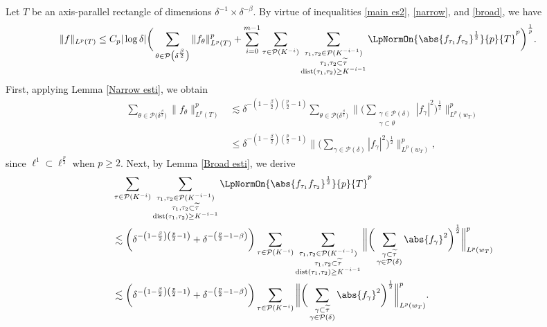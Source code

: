 \documentclass[reqno,centertags,11pt,a4paper]{amsart}
\begin{document}
Let $T$ be an axis-parallel rectangle of dimensions $\delta^{-1} \times \delta^{-\beta}$. By virtue of inequalities \eqref{main es2}, \eqref{narrow}, and \eqref{broad}, we have
\begin{align*}
\|f\|_{L^p(T)}
&\leq C_p|\log\delta| \bigg( \sum_{\theta \in \mathcal{P}\bigl(\delta^{\frac{\beta}{2}}\bigr)} \|f_\theta\|_{L^p(T)}^p + \sum_{i=0}^{m-1} \sum_{\tau \in \mathcal{P}(K^{-i})} \sum_{\substack{\tau_1,\tau_2 \in \mathcal{P}(K^{-i-1}) \\ \tau_1,\tau_2 \subset \widetilde{\tau} \\ \text{dist}(\tau_1,\tau_2) \geq  K^{-i-1}}} \LpNormOn{\abs{f_{\tau_1}f_{\tau_2}}^{\frac{1}{2}}}{p}{T}^p \bigg)^{\frac{1}{p}}.
\end{align*}
First, applying Lemma \ref{Narrow esti}, we obtain
\begin{align*}
\sum_{\theta \in \mathcal{P}\bigl(\delta^{\frac{\beta}{2}}\bigr)} \|f_\theta\|_{L^p(T)}^p
&\lesssim \delta^{-\left(1 - \frac{\beta}{2}\right)\left(\frac{p}{2} - 1\right)} \sum_{\theta \in \mathcal{P}\bigl(\delta^{\frac{\beta}{2}}\bigr)} \bigg\| \bigg( \sum_{\substack{\gamma \in \mathcal{P}(\delta) \\ \gamma \subset \theta}} |f_\gamma|^2 \bigg)^{\frac{1}{2}} \bigg\|_{L^p(w_T)}^p \\
&\leq \delta^{-\left(1 - \frac{\beta}{2}\right)\left(\frac{p}{2} - 1\right)} \bigg\| \bigg( \sum_{\gamma \in \mathcal{P}(\delta)} |f_\gamma|^2 \bigg)^{\frac{1}{2}} \bigg\|_{L^p(w_T)}^p,
\end{align*}
since $\ell^1 \subset \ell^{\frac{p}{2}}$ when $p\geq 2$. Next, by Lemma \ref{Broad esti}, we derive
\begin{align*}
& \sum_{\tau \in \mathcal{P}(K^{-i})} \sum_{\substack{\tau_1,\tau_2 \in \mathcal{P}(K^{-i-1}) \\ \tau_1,\tau_2 \subset \widetilde{\tau} \\ \text{dist}(\tau_1,\tau_2) \geq  K^{-i-1}}} \LpNormOn{\abs{f_{\tau_1}f_{\tau_2}}^{\frac{1}{2}}}{p}{T}^p \\
&\lesssim \bigg( \delta^{-\left(1 - \frac{\beta}{2}\right)\left(\frac{p}{2} - 1\right)} + \delta^{-\left(\frac{p}{2} - 1 - \beta\right)} \bigg) \sum_{\tau \in \mathcal{P}(K^{-i})} \sum_{\substack{\tau_1,\tau_2 \in \mathcal{P}(K^{-i-1}) \\ \tau_1,\tau_2 \subset \widetilde{\tau} \\ \text{dist}(\tau_1,\tau_2) \geq  K^{-i-1}}}\bigg\| \bigg( \sum_{\substack{\gamma \subset \widetilde{\tau} \\ \gamma \in \mathcal{P}(\delta)}} \abs{f_\gamma}^2 \bigg)^{\frac{1}{2}} \bigg\|_{L^p(w_T)}^p \\
&\lesssim \bigg( \delta^{-\left(1 - \frac{\beta}{2}\right)\left(\frac{p}{2} - 1\right)} + \delta^{-\left(\frac{p}{2} - 1 - \beta\right)} \bigg) \sum_{\tau \in \mathcal{P}(K^{-i})} \bigg\| \bigg( \sum_{\substack{\gamma \subset \widetilde{\tau} \\ \gamma \in \mathcal{P}(\delta)}} \abs{f_\gamma}^2 \bigg)^{\frac{1}{2}} \bigg\|_{L^p(w_T)}^p.
\end{align*}
\end{document}
